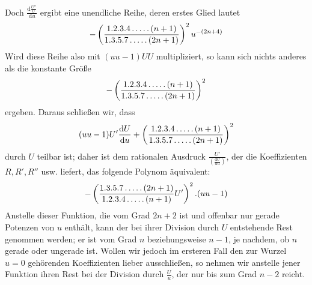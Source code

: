 Doch $\frac{\mathrm{d}\frac{U''}U}{\mathrm{d}u}$ ergibt eine unendliche Reihe, deren erstes Glied lautet
\[
-\left(\frac{1.2.3.4\mathinner{.\,.\,.\,.\,.}(n+1)}
{1.3.5.7\mathinner{.\,.\,.\,.\,.}(2n+1)}\right)^2u^{-(2n+4)}
\]
Wird diese Reihe also mit $(uu-1)UU$ multipliziert, so kann sich nichts anderes als die konstante Größe
\[
-\left(\frac{1.2.3.4\mathinner{.\,.\,.\,.\,.}(n+1)}
{1.3.5.7\mathinner{.\,.\,.\,.\,.}(2n+1)}\right)^2
\]
ergeben. Daraus schließen wir, dass
\[
(uu-1)U'\frac{\mathrm{d}U}{\mathrm{d}u}
+\left(\frac{1.2.3.4\mathinner{.\,.\,.\,.\,.}(n+1)}
{1.3.5.7\mathinner{.\,.\,.\,.\,.}(2n+1)}\right)^2
\]
durch $U$ teilbar ist; daher ist dem rationalen Ausdruck $\frac{U'}{(\frac{\mathrm{d}U}{\mathrm{d}u})}$, der die Koeffizienten $R,R',R''$ usw. liefert, das folgende Polynom äquivalent:
\[
-\left(\frac{1.3.5.7\mathinner{.\,.\,.\,.\,.}(2n+1)}
{1.2.3.4\mathinner{.\,.\,.\,.\,.}(n+1)}U'\right)^2.(uu-1)
\]
Anstelle dieser Funktion, die vom Grad $2n+2$ ist und offenbar nur gerade Potenzen von $u$ enthält, kann der bei ihrer Division durch $U$ entstehende Rest genommen werden; er ist vom Grad $n$ beziehungsweise $n-1$, je nachdem, ob $n$ gerade oder ungerade ist. Wollen wir jedoch im ersteren Fall den zur Wurzel $u=0$ gehörenden Koeffizienten lieber ausschließen, so nehmen wir anstelle jener Funktion ihren Rest bei der Division durch $\frac Uu$, der nur bis zum Grad $n-2$ reicht.

